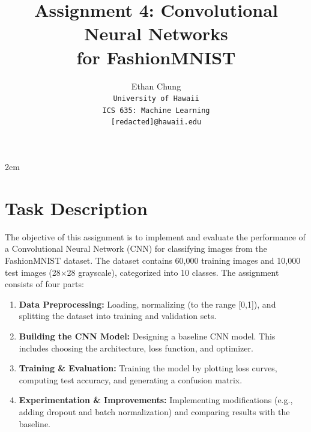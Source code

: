 \documentclass[letterpaper]{article}
\begin{document}
	\title{Assignment 4: Convolutional Neural Networks\\ for FashionMNIST}
	
	\author{Ethan Chung\\
		{\tt\small University of Hawaii}\\
		{\tt\small ICS 635: Machine Learning}\\
		{\tt\small [redacted]@hawaii.edu}}
	
	{\def\null\vskip 2em{}\maketitle}
	
	\section{Task Description}
	The objective of this assignment is to implement and evaluate the performance of a Convolutional Neural Network (CNN) for classifying images from the FashionMNIST dataset. The dataset contains 60,000 training images and 10,000 test images (28$\times$28 grayscale), categorized into 10 classes. The assignment consists of four parts:
	\begin{enumerate}
		\item \textbf{Data Preprocessing:} Loading, normalizing (to the range [0,1]), and splitting the dataset into training and validation sets.
		\item \textbf{Building the CNN Model:} Designing a baseline CNN model. This includes choosing the architecture, loss function, and optimizer.
		\item \textbf{Training \& Evaluation:} Training the model by plotting loss curves, computing test accuracy, and generating a confusion matrix.
		\item \textbf{Experimentation \& Improvements:} Implementing modifications (e.g., adding dropout and batch normalization) and comparing results with the baseline.
	\end{enumerate}
	
\end{document}
